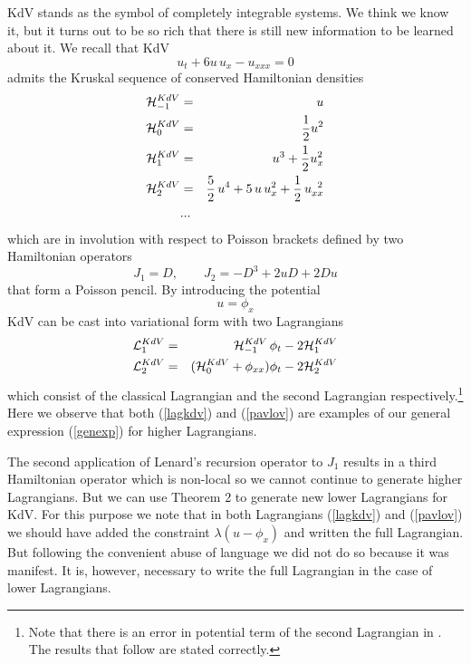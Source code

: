 \documentclass[a4paper,12pt]{article}
\begin{document}
KdV stands as the symbol of completely integrable systems. We
think we know it, but it turns out to be so rich that there is
still new information to be learned about it. We recall that KdV
\begin{equation}
 u_t + 6 u \, u_x - u_{xxx}  =0 \label{kdv}
\end{equation}
admits the Kruskal sequence of conserved Hamiltonian densities
\begin{eqnarray}
{\cal H}_{-1}^{KdV} &=& u \label{kdvcasimir1} \\
{\cal H}_{0}^{KdV} &=& \frac{1}{2} u^2 \label{kdvcasimir2} \\
{\cal H}_{1}^{KdV} &=& u^3 + \frac{1}{2} u_x^{2} \label{kdvh1} \\
{\cal H}_{2}^{KdV} &=&  \frac{5}{2} \, u^{4}  + 5 \, u \,
u_{x}^{2} + \frac{1}{2} \, u_{xx}^{\;\;2} \label{kdvh3}\\
& ... &  \nonumber
\end{eqnarray}
which are in involution with respect to Poisson brackets defined
by two Hamiltonian operators
\begin{equation}
J_1 = D, \qquad J_2 = - D^3 + 2 u D + 2 D u \label{kdvops}
\end{equation}
that form a Poisson pencil. By introducing the potential
\begin{equation}
u = \phi_x
\end{equation}
KdV can be cast into variational form with two Lagrangians
\begin{eqnarray}
{\cal L}_1^{KdV} & = & {\cal H}_{-1}^{KdV} \, \phi_t - 2 {\cal
H}_1^{KdV}  \label{lagkdv}\\
 {\cal L}_2^{KdV} & = & ( {\cal H}_{0}^{KdV} + \phi_{xx} ) \phi_t
 - 2 {\cal H}_2^{KdV} \label{pavlov}
\end{eqnarray}
which consist of the classical Lagrangian and the second
Lagrangian \cite{pavlov} respectively.\footnote{Note that there is
an error in potential term of the second Lagrangian in
\cite{nhepth}. The results that follow are stated correctly.} Here
we observe that both (\ref{lagkdv}) and (\ref{pavlov}) are
examples of our general expression (\ref{genexp}) for higher
Lagrangians.

The second application of Lenard's recursion operator to $J_1$
results in a third Hamiltonian operator which is non-local so we
cannot continue to generate higher Lagrangians. But we can use
Theorem 2 to generate new lower Lagrangians for KdV. For this
purpose we note that in both Lagrangians (\ref{lagkdv}) and
(\ref{pavlov}) we should have added the constraint $ \lambda ( u -
\phi_x )$ and written the full Lagrangian. But following the
convenient abuse of language we did not do so because it was
manifest. It is, however, necessary to write the full Lagrangian
in the case of lower Lagrangians.
\end{document}
